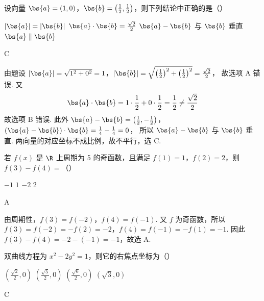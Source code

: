 \begin{problem}
设向量 \(\bs{a} = (1,0)\)，\(\bs{b} = \left(\frac{1}{2}, \frac{1}{2}\right)\)，则下列结论中正确的是（\quad）

\choices
    {\(|\bs{a}| = |\bs{b}|\)}
    {\(\bs{a} \cdot \bs{b} = \frac{\sqrt{2}}{2}\)}
    {\(\bs{a} - \bs{b}\) 与 \(\bs{b}\) 垂直}
    {\(\bs{a} \parallel \bs{b}\)}
\end{problem}

\begin{answer}
C
\end{answer}

\begin{solution}
由题设
\(|\bs{a}|=\sqrt{1^2+0^2}=1\)，\(|\bs{b}|=\sqrt{\left(\frac{1}{2}\right)^2+\left(\frac{1}{2}\right)^2}=\frac{\sqrt{2}}{2}\)，
故选项 A 错误. 又
\[
\bs{a}\cdot\bs{b}=1\cdot\frac{1}{2}+0\cdot\frac{1}{2}=\frac{1}{2}\neq\frac{\sqrt{2}}{2}
\]
故选项 B 错误. 此外
\(\bs{a}-\bs{b}=\left(\frac{1}{2},-\frac{1}{2}\right)\)，\((\bs{a}-\bs{b})\cdot\bs{b}=\frac{1}{4}-\frac{1}{4}=0\)，
所以 \(\bs{a}-\bs{b}\) 与 \(\bs{b}\) 垂直. 两向量的对应坐标不成比例，故不平行，选 C.
\end{solution}

\begin{problem}
若 \( f(x) \) 是 \( \R \) 上周期为 5 的奇函数，且满足 \(f(1) = 1\)，\(f(2) = 2\)，则 \( f(3) - f(4) = \)（\quad）

\choices
    {\(-1\)}
    {\(1\)}
    {\(-2\)}
    {\(2\)}
\end{problem}

\begin{answer}
A
\end{answer}

\begin{solution}
由周期性，\(f(3)=f(-2)\)，\(f(4)=f(-1)\). 又 \(f\) 为奇函数，所以
\(f(3)=f(-2)=-f(2)=-2\)，\(f(4)=f(-1)=-f(1)=-1\).
因此 \(f(3)-f(4)=-2-(-1)=-1\)，故选 A.
\end{solution}

\begin{problem}
双曲线方程为 \(x^{2} - 2y^{2} = 1\)，则它的右焦点坐标为（\quad）

\choices
    {\(\left(\frac{\sqrt{2}}{2}, 0\right)\)}
    {\(\left(\frac{\sqrt{5}}{2}, 0\right)\)}
    {\(\left(\frac{\sqrt{6}}{2}, 0\right)\)}
    {\((\sqrt{3},0)\)}
\end{problem}

\begin{answer}
C
\end{answer}

